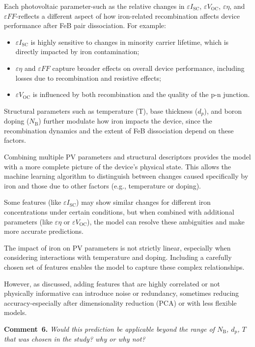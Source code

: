 \documentclass[a4paper,fleqn]{cas-sc}
\begin{document}
Each photovoltaic parameter-such as the relative changes in $\varepsilon I_\mathrm{SC}$, $\varepsilon V_\mathrm{OC}$, $\varepsilon \eta$, and $\varepsilon FF$-reflects a different aspect of how iron-related recombination affects device performance after FeB pair dissociation. For example:
\begin{itemize}
    \item $\varepsilon I_\mathrm{SC}$ is highly sensitive to changes in minority carrier lifetime, which is directly impacted by iron contamination;
    \item $\varepsilon \eta$ and $\varepsilon FF$ capture broader effects on overall device performance, including losses due to recombination and resistive effects;
    \item $\varepsilon V_\mathrm{OC}$ is influenced by both recombination and the quality of the p-n junction.
\end{itemize}

Structural parameters such as temperature (T), base thickness ($d_p$), and boron doping ($N_\mathrm{B}$) further modulate how iron impacts the device, since the recombination dynamics and the extent of FeB dissociation depend on these factors.


Combining multiple PV parameters and structural descriptors provides the model with a more complete picture of the device’s physical state. This allows the machine learning algorithm to distinguish between changes caused specifically by iron and those due to other factors (e.g., temperature or doping).


Some features (like $\varepsilon I_\mathrm{SC}$) may show similar changes for different iron concentrations under certain conditions, but when combined with additional parameters (like $\varepsilon \eta$ or $\varepsilon V_\mathrm{OC}$), the model can resolve these ambiguities and make more accurate predictions.


The impact of iron on PV parameters is not strictly linear, especially when considering interactions with temperature and doping.
Including a carefully chosen set of features enables the model to capture these complex relationships.


However, as discussed, adding features that are highly correlated or not physically informative can introduce noise or redundancy, sometimes reducing accuracy-especially after dimensionality reduction (PCA) or with less flexible models.

\vspace{1cm}
\noindent
\textcolor[rgb]{0.00,0.50,1.00}{\textbf{Comment~6.}}
\emph{Would this prediction be applicable beyond the range of $N_\mathrm{B}$, $d_p$, $T$ that was chosen in the study? why or why not?}
\end{document}
